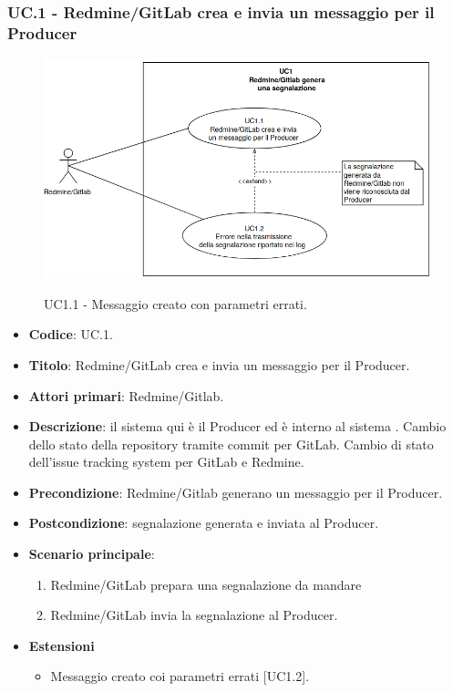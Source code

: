 \subsubsection{UC\theuccount.1 - Redmine/GitLab crea e invia un messaggio per il Producer}
    \begin{figure}[H]
		\centering
		\includegraphics[width=1\textwidth]{img/UC1_1.png}\\
		\caption{UC1.1 - Messaggio creato con parametri errati.}
	\end{figure}
	\begin{itemize}
		\item \textbf{Codice}: UC\theuccount.1.
		\item \textbf{Titolo}: Redmine/GitLab crea e invia un messaggio per il Producer.
		\item \textbf{Attori primari}: Redmine/Gitlab.
		\item \textbf{Descrizione}:
		il sistema qui è il Producer ed è interno al sistema \progetto. Cambio dello stato della repository tramite commit per GitLab. Cambio di stato dell'issue tracking system per GitLab e Redmine.
		\item \textbf{Precondizione}: Redmine/Gitlab generano un messaggio per il Producer.
		\item \textbf{Postcondizione}: segnalazione generata e inviata al Producer.
		\item \textbf{Scenario principale}: 
		\begin{enumerate}
			\item Redmine/GitLab prepara una segnalazione da mandare
			\item Redmine/GitLab invia la segnalazione al Producer.
		\end{enumerate}
		\item \textbf{Estensioni}
		\begin{itemize}
			\item Messaggio creato coi parametri errati [UC1.2].
		\end{itemize} 
	\end{itemize}


